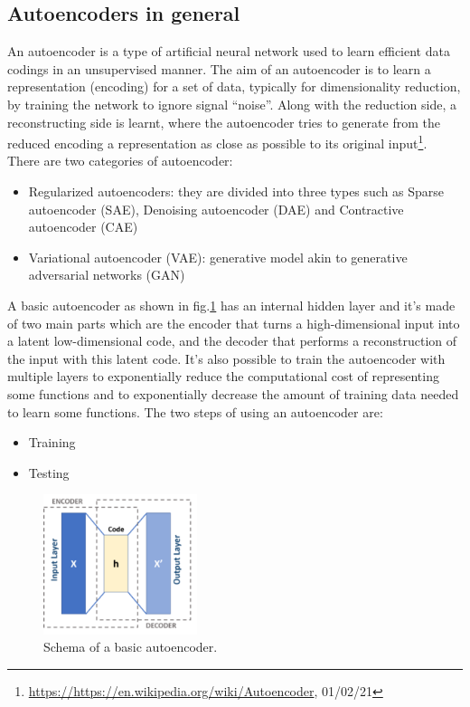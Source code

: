 \subsection{Autoencoders in general}
An autoencoder is a type of artificial neural network used to learn efficient data codings in an unsupervised manner. The aim of an autoencoder is to learn a representation (encoding) for a set of data, typically for dimensionality reduction, by training the network to ignore signal “noise”. Along with the reduction side, a reconstructing side is learnt, where the autoencoder tries to generate from the reduced encoding a representation as close as possible to its original input\footnote{\url{https://https://en.wikipedia.org/wiki/Autoencoder}, 01/02/21}.
There are two categories of autoencoder:
\begin{itemize}
\item Regularized autoencoders: they are divided into three types such as Sparse autoencoder (SAE), Denoising autoencoder (DAE) and Contractive autoencoder (CAE)
\item Variational autoencoder (VAE): generative model akin to generative adversarial networks (GAN)
\end{itemize}
A basic autoencoder as shown in fig.\ref{fig:autoencoder}  has an internal hidden layer and it's made of two main parts which are the encoder that turns a high-dimensional input into a latent low-dimensional code, and the decoder that performs a reconstruction of the input with this latent code. It's also possible to train the autoencoder with multiple layers to exponentially reduce the computational cost of representing some functions and to exponentially decrease the amount of training data needed to learn some functions. 
The two steps of using an autoencoder are:
\begin{itemize}
\item Training
\item Testing
\end{itemize}
\begin{figure}[h!]
    \centering
    \includegraphics[width=0.4\textwidth]{images/autoencoder.png}
    \caption{Schema of a basic autoencoder.}
    \label{fig:autoencoder}    
\end{figure}

